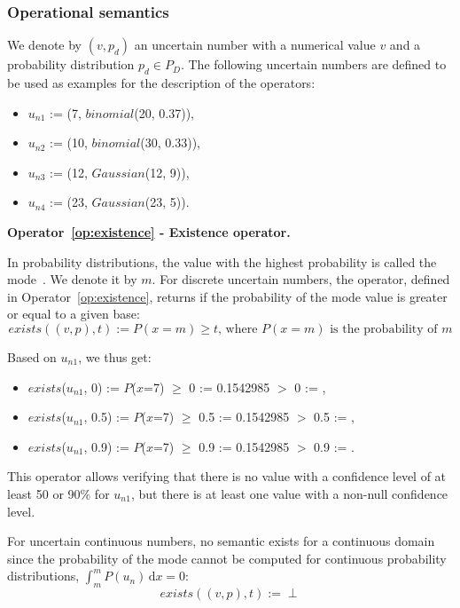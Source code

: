 \subsubsection{Operational semantics}
We denote by $(v, p_d)$ an uncertain number with a numerical value $v$ and a probability distribution $p_d \in P_D$.
The following uncertain numbers are defined to be used as examples for the description of the operators:
\begin{itemize}
    \item $u_{n1}$ := (7, $binomial$(20, 0.37)),
    \item $u_{n2}$ := (10, $binomial$(30, 0.33)),
    \item $u_{n3}$ := (12, $Gaussian$(12, 9)),
    \item $u_{n4}$ := (23, $Gaussian$(23, 5)).
\end{itemize}

\bigskip

\noindent\textbf{Operator~\ref{op:existence} - Existence operator.~}

In probability distributions, the value with the highest probability is called the mode~\cite{mood1963introduction}.
We denote it by $m$.
For discrete uncertain numbers, the operator, defined in Operator~\ref{op:existence}, returns \true{} if the probability of the mode value is greater or equal to a given base:
$$exists((v, p), t) := P(x=m)\geqslant t \text{, where $P(x=m)$ is the probability of $m$}$$

Based on $u_{n1}$, we thus get:
\begin{itemize}
    \item $exists$($u_{n1}$, 0) := $P$($x$=7) $\geqslant$ 0 := 0.1542985 $>$ 0 := \true{},
    \item $exists$($u_{n1}$, 0.5) := $P$($x$=7) $\geqslant$ 0.5 := 0.1542985 $>$ 0.5 := \false{},
    \item $exists$($u_{n1}$, 0.9) := $P$($x$=7) $\geqslant$ 0.9 := 0.1542985 $>$ 0.9 := \false{}.
\end{itemize}
This operator allows verifying that there is no value with a confidence level of at least 50 or 90\% for $u_{n1}$, but there is at least one value with a non-null confidence level.

For uncertain continuous numbers, no semantic exists for a continuous domain since the probability of the mode cannot be computed for continuous probability distributions, $\int_{m}^{m} P(u_n)\,\mathrm{d}x = 0$: 
$$exists((v, p), t) := \perp$$

